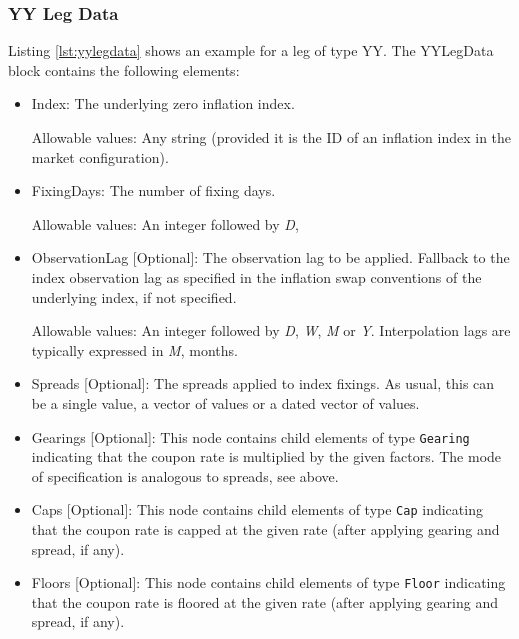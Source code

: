 \subsubsection{YY Leg Data}
\label{ss:yylegdata}

Listing \ref{lst:yylegdata} shows an example for a leg of type YY. The YYLegData block contains the following
elements:

\begin{itemize}
\item Index: The underlying zero inflation index.

Allowable values:  Any string (provided it is the ID of an inflation index in the market configuration).
\item FixingDays: The number of fixing days.

Allowable values: An integer followed by \emph{D},
\item ObservationLag [Optional]: The observation lag to be applied. Fallback to the index observation lag as specified in the inflation swap conventions of the underlying index, if not specified. 

Allowable values: An integer followed by \emph{D}, \emph{W}, \emph{M} or \emph{Y}. Interpolation lags are typically expressed in \emph{M}, months.


\item Spreads [Optional]: The spreads applied to index fixings. As usual, this can be a single value, a vector of values or a dated vector of
  values.

\item Gearings [Optional]: This node contains child elements of type \lstinline!Gearing! indicating that the coupon rate is
  multiplied by the given factors. The mode of specification is analogous to spreads, see above.

\item Caps [Optional]: This node contains child elements of type \lstinline!Cap! indicating that the coupon rate is capped at the
  given rate (after applying gearing and spread, if any).

\item Floors [Optional]: This node contains child elements of type \lstinline!Floor! indicating that the coupon rate is floored at
  the given rate (after applying gearing and spread, if any).


\end{itemize}
